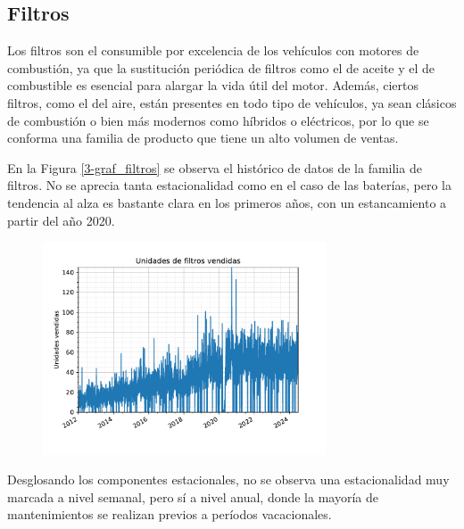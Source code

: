\subsection{Filtros}

Los filtros son el consumible por excelencia de los vehículos con motores de combustión, ya que la sustitución periódica de filtros como el de aceite y el de combustible es esencial para alargar la vida útil del motor. Además, ciertos filtros, como el del aire, están presentes en todo tipo de vehículos, ya sean clásicos de combustión o bien más modernos como híbridos o eléctricos, por lo que se conforma una familia de producto que tiene un alto volumen de ventas.

En la Figura \ref*{3-graf_filtros} se observa el histórico de datos de la familia de filtros. No se aprecia tanta estacionalidad como en el caso de las baterías, pero la tendencia al alza es bastante clara en los primeros años, con un estancamiento a partir del año 2020.

\begin{figure}[H]
	{\includegraphics[width=0.75\textwidth]{imagenes/grafica_filtros.pdf}}
\end{figure}

Desglosando los componentes estacionales, no se observa una estacionalidad muy marcada a nivel semanal, pero sí a nivel anual, donde la mayoría de mantenimientos se realizan previos a períodos vacacionales.

